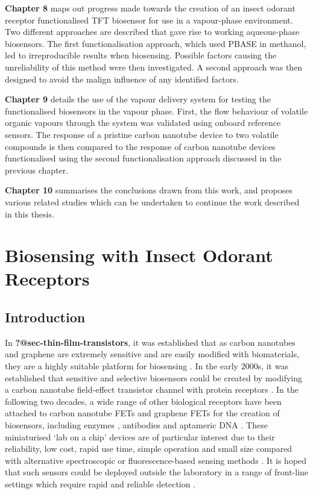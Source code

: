 \documentclass[
  a4paper,
]{scrbook}
\begin{document}
\textbf{Chapter 8} maps out progress made towards the creation of an
insect odorant receptor functionalised TFT biosensor for use in a
vapour-phase environment. Two different approaches are described that
gave rise to working aqueous-phase biosensors. The first
functionalisation approach, which used PBASE in methanol, led to
irreproducible results when biosensing. Possible factors causing the
unreliability of this method were then investigated. A second approach
was then designed to avoid the malign influence of any identified
factors.

\textbf{Chapter 9} details the use of the vapour delivery system for
testing the functionalised biosensors in the vapour phase. First, the
flow behaviour of volatile organic vapours through the system was
validated using onboard reference sensors. The response of a pristine
carbon nanotube device to two volatile compounds is then compared to the
response of carbon nanotube devices functionalised using the second
functionalisation approach discussed in the previous chapter.

\textbf{Chapter 10} summarises the conclusions drawn from this work, and
proposes various related studies which can be undertaken to continue the
work described in this thesis.


\hypertarget{sec-iOR-sensors}{%
\chapter{Biosensing with Insect Odorant
Receptors}\label{sec-iOR-sensors}}

\hypertarget{sec-biosensing-transducers}{%
\section{Introduction}\label{sec-biosensing-transducers}}

In \textbf{?@sec-thin-film-transistors}, it was established that as
carbon nanotubes and graphene are extremely sensitive and are easily
modified with biomaterials, they are a highly suitable platform for
biosensing \autocite{Kauffman2008,Ohno2010}. In the early 2000s, it was
established that sensitive and selective biosensors could be created by
modifying a carbon nanotube field-effect transistor channel with protein
receptors \autocite{Chen2003,Kauffman2008}. In the following two
decades, a wide range of other biological receptors have been attached
to carbon nanotube FETs and graphene FETs for the creation of
biosensors, including enzymes \autocite{Lee2009,Zhang2015a,Dudina2019},
antibodies \autocite{Kim2008,Jin2015,Tsang2019} and aptameric DNA
\autocite{Maehashi2007,Gao2016,Nguyen2021}. These miniaturised `lab on a
chip' devices are of particular interest due to their reliability, low
cost, rapid use time, simple operation and small size compared with
alternative spectroscopic or fluorescence-based sensing methods
\autocite{Khan2020}. It is hoped that such sensors could be deployed
outside the laboratory in a range of front-line settings which require
rapid and reliable detection \autocite{Dung2018,Yang2018,Kim2022a}.
\end{document}
